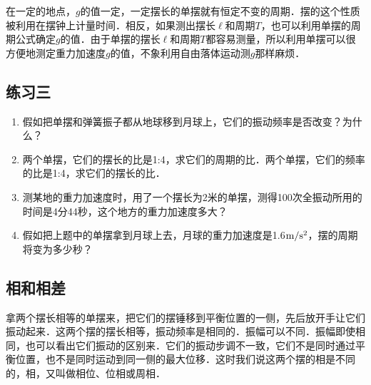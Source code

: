 在一定的地点，$g$的值一定，一定摆长的单摆就有恒定不变的周期．摆的这个性质被利用在摆钟上计量时间．相反，如果测出摆长$\ell$和周期$T$，也可以利用单摆的周期公式确定$g$的值．由于单摆的摆长$\ell$和周期$T$都容易测量，所以利用单摆可以很方便地测定重力加速度$g$的值，不象利用自由落体运动测$g$那样麻烦．

\subsection*{练习三}
\begin{enumerate}
    \item 假如把单摆和弹簧振子都从地球移到月球上，它们的振动频率是否改变？为什么？
    \item 两个单摆，它们的摆长的比是1:4，求它们的周期的比．两个单摆，它们的频率的比是1:4，求它们的摆长的比．
    \item 测某地的重力加速度时，用了一个摆长为2米的单摆，测得100次全振动所用的时间是4分44秒，这个地方的重力加速度多大？
    \item 假如把上题中的单摆拿到月球上去，月球的重力加速度是1.6$\text{m}/\text{s}^2$，摆的周期将变为多少秒？
\end{enumerate}

\subsection{相和相差}
拿两个摆长相等的单摆来，把它们的摆锤移到平衡位置的一侧，先后放开手让它们振动起来．这两个摆的摆长相等，振动频率是相同的．振幅可以不同．振幅即使相同，也可以看出它们振动的区别来．它们的振动步调不一致，它们不是同时通过平衡位置，也不是同时运动到同一侧的最大位移．这时我们说这两个摆的相是不同的，相，又叫做相位、位相或周相．

